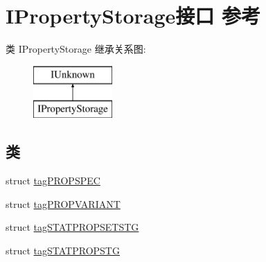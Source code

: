 \hypertarget{interface_i_property_storage}{}\section{I\+Property\+Storage接口 参考}
\label{interface_i_property_storage}
类 I\+Property\+Storage 继承关系图\+:\begin{figure}[H]
\begin{center}
\leavevmode
\includegraphics[height=2.000000cm]{interface_i_property_storage}
\end{center}
\end{figure}
\subsection*{类}
\begin{DoxyCompactItemize}
\item 
struct \hyperlink{struct_i_property_storage_1_1tag_p_r_o_p_s_p_e_c}{tag\+P\+R\+O\+P\+S\+P\+EC}
\item 
struct \hyperlink{struct_i_property_storage_1_1tag_p_r_o_p_v_a_r_i_a_n_t}{tag\+P\+R\+O\+P\+V\+A\+R\+I\+A\+NT}
\item 
struct \hyperlink{struct_i_property_storage_1_1tag_s_t_a_t_p_r_o_p_s_e_t_s_t_g}{tag\+S\+T\+A\+T\+P\+R\+O\+P\+S\+E\+T\+S\+TG}
\item 
struct \hyperlink{struct_i_property_storage_1_1tag_s_t_a_t_p_r_o_p_s_t_g}{tag\+S\+T\+A\+T\+P\+R\+O\+P\+S\+TG}
\end{DoxyCompactItemize}
